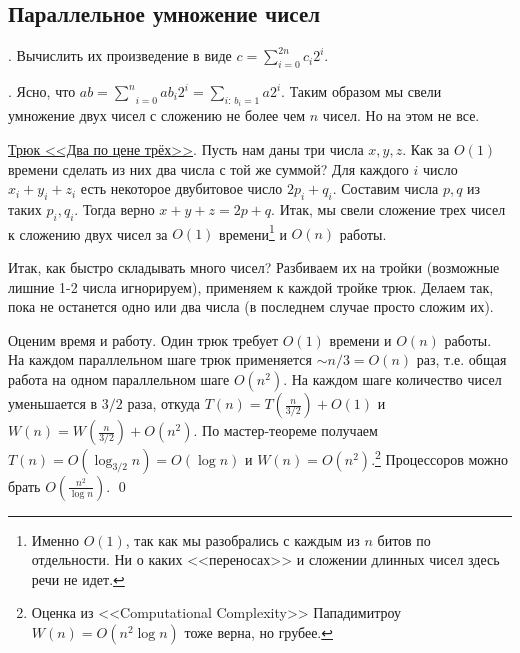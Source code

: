 \subsection{Параллельное умножение чисел}
. Вычислить их произведение в виде $c = \sum_{i=0}^{2n} c_i 2^i$.

.{} Ясно, что $ab = \underset{i=0}{\overset{n}{\sum}}a b_i 2^i = \underset{i: \, b_i=1}{\sum} a 2^i$. Таким образом мы свели умножение двух чисел с сложению не более чем $n$ чисел. Но на этом не все.

\underline{Трюк <<Два по цене трёх>>}. Пусть нам даны три числа $x, y, z$. Как за $O(1)$ времени сделать из них два числа с той же суммой? Для каждого $i$ число $x_i + y_i + z_i$ есть некоторое двубитовое число $2p_i + q_i$. Составим числа $p,q$ из таких $p_i, q_i$. Тогда верно $x+y+z = 2p+q$. Итак, мы свели сложение трех чисел к сложению двух чисел за $O(1)$ времени\footnote{Именно $O(1)$, так как мы разобрались с каждым из $n$ битов по отдельности. Ни о каких <<переносах>> и сложении длинных чисел здесь речи не идет.} и $O(n)$ работы.

Итак, как быстро складывать много чисел? Разбиваем их на тройки (возможные лишние 1-2 числа игнорируем), применяем к каждой тройке трюк. Делаем так, пока не останется одно или два числа (в последнем случае просто сложим их). 

Оценим время и работу. Один трюк требует $O(1)$ времени и $O(n)$ работы. На каждом параллельном шаге трюк применяется $\sim n/3 = O(n)$ раз, т.е. общая работа на одном параллельном шаге $O(n^2)$. На каждом шаге количество чисел уменьшается в $3/2$ раза, откуда $T(n) = T(\frac{n}{3/2}) + O(1)$ и $W(n) = W(\frac{n}{3/2}) + O(n^2)$. По мастер-теореме получаем $T(n) = O(\log_{3/2}n) = O(\log n)$ и $W(n) = O(n^2)$.\footnote{Оценка из <<Computational Complexity>> Пападимитроу $W(n) = O(n^2\log n)$ тоже верна, но грубее.} Процессоров можно брать $O(\frac{n^2}{\log n})$. \qed